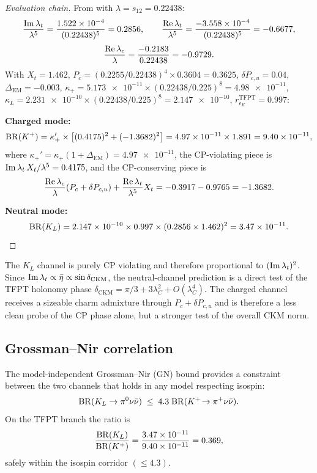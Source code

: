 \begin{proof}[Evaluation chain]
From  with
$\lambda=s_{12}=\num{0.22438}$:
\[
\frac{\operatorname{Im}\lambda_t}{\lambda^5}
=
\frac{\num{1.522e-4}}{(0.22438)^5}
=
\num{0.2856},
\qquad
\frac{\operatorname{Re}\lambda_t}{\lambda^5}
=
\frac{-\num{3.558e-4}}{(0.22438)^5}
=
\num{-0.6677},
\]
\[
\frac{\operatorname{Re}\lambda_c}{\lambda}
=
\frac{-\num{0.2183}}{0.22438}
=
\num{-0.9729}.
\]
With $X_t=1.462$, $P_c=(0.2255/0.22438)^4\times 0.3604=\num{0.3625}$,
$\delta P_{c,u}=0.04$, $\Delta_{\mathrm{EM}}=-0.003$,
$\kappa_+=\num{5.173e-11}\times(0.22438/0.225)^8=\num{4.98e-11}$,
$\kappa_L=\num{2.231e-10}\times(0.22438/0.225)^8=\num{2.147e-10}$,
$r_{\epsilon_K}^{\mathrm{TFPT}}=0.997$:

\medskip
\noindent\textbf{Charged mode:}
\[
\mathrm{BR}(K^+)
=
\kappa_+'\times\bigl[
(\num{0.4175})^2
+
(\num{-1.3682})^2
\bigr]
=
\num{4.97e-11}\times\num{1.891}
=
\num{9.40e-11},
\]
where $\kappa_+'=\kappa_+(1+\Delta_{\mathrm{EM}})=\num{4.97e-11}$,
the CP-violating piece is $\operatorname{Im}\lambda_t\,X_t/\lambda^5=\num{0.4175}$,
and the CP-conserving piece is
\[
\frac{\operatorname{Re}\lambda_c}{\lambda}(P_c+\delta P_{c,u})
+\frac{\operatorname{Re}\lambda_t}{\lambda^5}X_t
=
\num{-0.3917}-\num{0.9765}
=
\num{-1.3682}.
\]

\noindent\textbf{Neutral mode:}
\[
\mathrm{BR}(K_L)
=
\num{2.147e-10}\times 0.997
\times(0.2856\times 1.462)^2
=
\num{3.47e-11}.
\]
\end{proof}

\begin{remark}
The $K_L$ channel is purely CP violating and therefore proportional to
$(\operatorname{Im}\lambda_t)^2$.
Since $\operatorname{Im}\lambda_t\propto\bar\eta\propto\sin\delta_{\mathrm{CKM}}$,
the neutral-channel prediction is a direct test of the TFPT holonomy
phase $\delta_{\mathrm{CKM}}=\pi/3+3\lambda_C^2+O(\lambda_C^4)$.
The charged channel receives a sizeable charm admixture through
$P_c+\delta P_{c,u}$ and is therefore a less clean probe of the
CP phase alone, but a stronger test of the overall CKM norm.
\end{remark}


\subsection{Grossman--Nir correlation}

The model-independent Grossman--Nir (GN) bound provides a
constraint between the two channels that holds in any model
respecting isospin:
\begin{equation}
\label{eq:gn-bound}
\mathrm{BR}(K_L\to\pi^0\nu\bar\nu)
\;\le\;
4.3\;\mathrm{BR}(K^+\!\to\pi^+\nu\bar\nu).
\end{equation}
On the TFPT branch the ratio is
\begin{equation}
\label{eq:gn-ratio}
\frac{\mathrm{BR}(K_L)}{\mathrm{BR}(K^+)}
=
\frac{\num{3.47e-11}}{\num{9.40e-11}}
=
0.369,
\end{equation}
safely within the isospin corridor $(\le 4.3)$.

